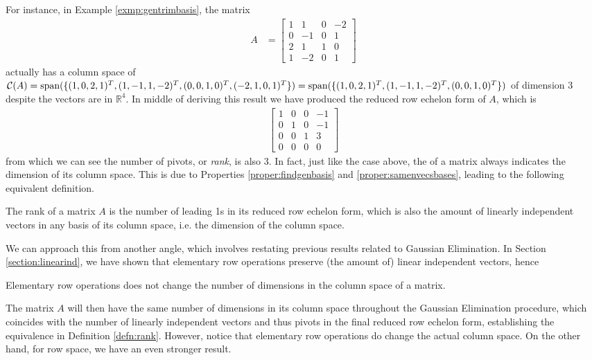 For instance, in Example \ref{exmp:gentrimbasis}, the matrix
\begin{align*}
A &= 
\begin{bmatrix}
1 & 1 & 0 & -2\\
0 & -1 & 0 & 1\\
2 & 1 & 1 & 0\\
1 & -2 & 0 & 1
\end{bmatrix}
\end{align*}
actually has a column space of $\mathcal{C}(A) = \text{span}(\{(1,0,2,1)^T, (1,-1,1,-2)^T, \\ (0,0,1,0)^T, (-2,1,0,1)^T\}) = \text{span}(\{(1,0,2,1)^T, (1,-1,1,-2)^T, (0,0,1,0)^T\})$ of dimension $3$ despite the vectors are in $\mathbb{R}^4$. In middle of deriving this result we have produced the reduced row echelon form of $A$, which is 
\begin{align*}
\begin{bmatrix}
1 & 0 & 0 & -1\\
0 & 1 & 0 & -1\\
0 & 0 & 1 & 3\\
0 & 0 & 0 & 0 
\end{bmatrix}
\end{align*}
from which we can see the number of pivots, or \textit{rank}, is also $3$. In fact, just like the case above, the  of a matrix always indicates the dimension of its column space. This is due to Properties \ref{proper:findgenbasis} and \ref{proper:samenvecsbases}, leading to the following equivalent definition.
\begin{defn}[Rank]
\label{defn:rank}
The rank of a matrix $A$ is the number of leading 1s in its reduced row echelon form, which is also the amount of linearly independent vectors in any basis of its column space, i.e. the dimension of the column space.
\end{defn}
We can approach this from another angle, which involves restating previous results related to Gaussian Elimination. In Section \ref{section:linearind}, we have shown that elementary row operations preserve (the amount of) linear independent vectors, hence
\begin{proper}
\label{proper:elemrowopcolrank}
Elementary row operations does not change the number of dimensions in the column space of a matrix.
\end{proper}
The matrix $A$ will then have the same number of dimensions in its column space throughout the Gaussian Elimination procedure, which coincides with the number of linearly independent vectors and thus pivots in the final reduced row echelon form, establishing the equivalence in Definition \ref{defn:rank}. However, notice that elementary row operations do change the actual column space. On the other hand, for row space, we have an even stronger result.

